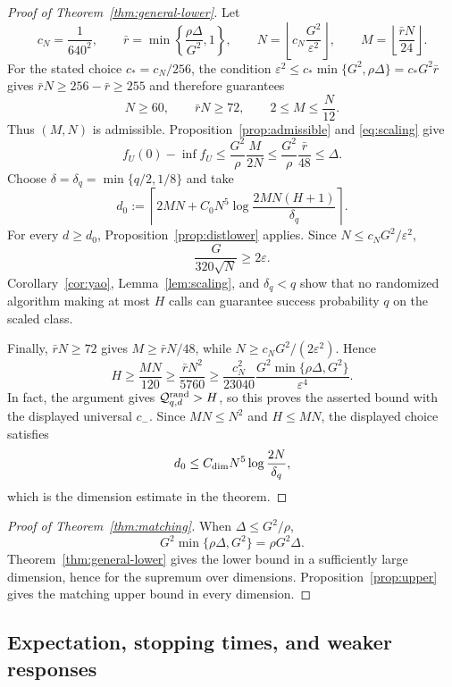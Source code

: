 \documentclass[11pt,a4paper]{article}
\newcommand{\eps}{\varepsilon}
\newcommand{\cQ}{\mathcal Q}
\theoremstyle{definition}
\numberwithin{equation}{section}
\begin{document}
\begin{proof}[Proof of Theorem~\ref{thm:general-lower}]
Let
\[
 c_N=\frac1{640^2},
 \qquad
 \bar r=\min\left\{\frac{\rho\Delta}{G^2},1\right\},
 \qquad
 N=\left\lfloor c_N\frac{G^2}{\eps^2}\right\rfloor,
 \qquad
 M=\left\lfloor\frac{\bar rN}{24}\right\rfloor.
\]
For the stated choice $c_*=c_N/256$, the condition
$\eps^2\le c_*\min\{G^2,\rho\Delta\}=c_*G^2\bar r$ gives $\bar rN\ge256-\bar r\ge255$ and therefore guarantees
\[
 N\ge60,
 \qquad
 \bar rN\ge72,
 \qquad
 2\le M\le\frac N{12}.
\]
Thus $(M,N)$ is admissible.  Proposition~\ref{prop:admissible} and \eqref{eq:scaling} give
\[
 f_U(0)-\inf f_U
 \le\frac{G^2}{\rho}\frac{M}{2N}
 \le\frac{G^2}{\rho}\frac{\bar r}{48}
 \le\Delta.
\]
Choose $\delta=\delta_q=\min\{q/2,1/8\}$ and take
\[
 d_0:=\left\lceil
 2MN+C_0N^5\log\frac{2MN(H+1)}{\delta_q}
 \right\rceil.
\]
For every $d\ge d_0$, Proposition~\ref{prop:distlower} applies.  Since $N\le c_NG^2/\eps^2$,
\[
 \frac{G}{320\sqrt N}\ge2\eps.
\]
Corollary~\ref{cor:yao}, Lemma~\ref{lem:scaling}, and $\delta_q<q$ show that no randomized algorithm making at most $H$ calls can guarantee success probability $q$ on the scaled class.

Finally, $\bar rN\ge72$ gives $M\ge\bar rN/48$, while
$N\ge c_NG^2/(2\eps^2)$. Hence
\[
 H\ge\frac{MN}{120}
  \ge\frac{\bar rN^2}{5760}
  \ge\frac{c_N^2}{23040}
       \frac{G^2\min\{\rho\Delta,G^2\}}{\eps^4}.
\]
In fact, the argument gives $\cQ^{\rm rand}_{q,d}>H$, so this proves
the asserted bound with the displayed universal $c_-$.
Since $MN\le N^2$ and $H\le MN$, the displayed choice satisfies
\[
 d_0\le C_{\rm dim}N^5\log\frac{2N}{\delta_q},
\]
which is the dimension estimate in the theorem.
\end{proof}

\begin{proof}[Proof of Theorem~\ref{thm:matching}]
When $\Delta\le G^2/\rho$,
\[
 G^2\min\{\rho\Delta,G^2\}=\rho G^2\Delta.
\]
Theorem~\ref{thm:general-lower} gives the lower bound in a sufficiently large dimension, hence for the supremum over dimensions.  Proposition~\ref{prop:upper} gives the matching upper bound in every dimension.
\end{proof}

\subsection{Expectation, stopping times, and weaker responses}
\end{document}
